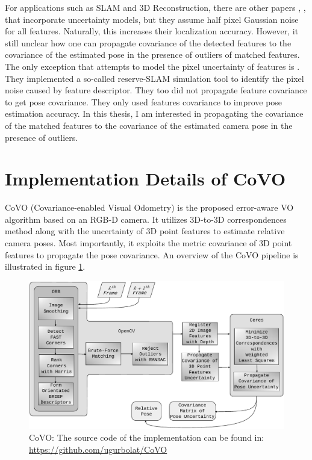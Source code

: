 \documentclass[a4paper]{report}
\numberwithin{figure}{section}
\begin{document}
For applications such as SLAM and 3D Reconstruction, there are other papers
\parencite{Endres2014}, \parencite{Konolige08}, \parencite{Di2016a} that 
incorporate
uncertainty models, but they assume half pixel Gaussian noise for all features.
Naturally, this increases their localization accuracy. However, it still
unclear how one can propagate covariance of the detected features to the
covariance of the estimated pose in the presence of outliers of matched
features.  The only exception that attempts to model the pixel uncertainty of
features is \parencite{Belter2018a}.  They implemented a so-called reserve-SLAM
simulation tool to identify the pixel noise caused by feature descriptor.  They
too did not propagate feature covariance to get pose covariance.  They only
used features covariance to improve pose estimation accuracy.  In this thesis,
I am interested in propagating the covariance of the matched features to the
covariance of the estimated camera pose in the presence of outliers.

\section{Implementation Details of CoVO}

CoVO (Covariance-enabled Visual Odometry) is the proposed error-aware VO
algorithm based on an RGB-D camera.  It utilizes 3D-to-3D correspondences
method along with the uncertainty of 3D point features to estimate relative
camera poses. Most importantly, it exploits the metric covariance of 3D point
features to propagate the pose covariance.  An overview of the CoVO pipeline is
illustrated in figure \ref{fig:covo_pipeline}.

\begin{figure}[H] \centering
\includegraphics[width=0.9\linewidth,natwidth=640,natheight=640]
{fig/drawings/covo.pdf} \caption[CoVO Pipeline]{CoVO: The source code of the
implementation can be found in:
\href{https://github.com/ugurbolat/CoVO}{https://github.com/ugurbolat/CoVO}}
\label{fig:covo_pipeline} \end{figure}
\end{document}
